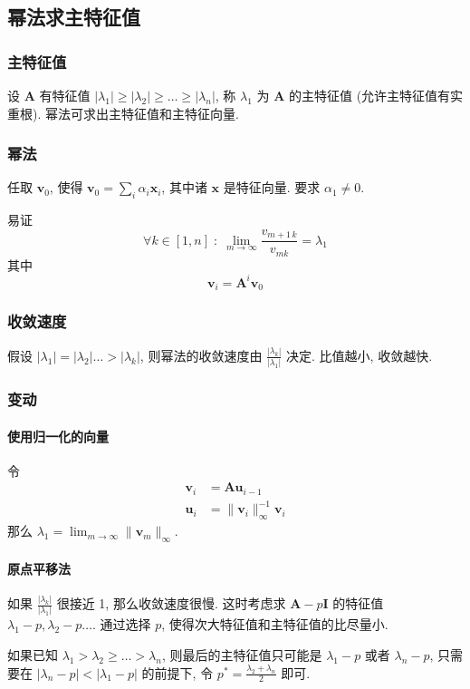 \documentclass{ctexart}
\begin{document}
\subsection{幂法求主特征值}
\subsubsection{主特征值}
    设 $\mathbf{A}$ 有特征值 $|\lambda_1| \ge |\lambda_2| \ge \ldots \ge |\lambda_n|$,
    称 $\lambda_1$ 为 $\mathbf{A}$ 的主特征值 (允许主特征值有实重根). 幂法可求出主特征值和主特征向量.
\subsubsection{幂法}
    任取 $\mathbf{v}_0$, 使得 $\mathbf{v}_0 = \sum_i \alpha_i \mathbf{x}_i$, 其中诸 $\mathbf{x}$ 是特征向量.
    要求 $\alpha_1 \neq 0$.\par
    易证 \[
        \forall k \in [1,n]\;:\; \lim_{m\to\infty} \frac{v_{m+1\,k}}{v_{mk}} = \lambda_1\]
    其中 \[ \mathbf{v}_i = \mathbf{A}^i \mathbf{v}_0 \]
\subsubsection{收敛速度}
    假设 $|\lambda_1| = |\lambda_2| \ldots > |\lambda_k|$, 则幂法的收敛速度由 $\frac{|\lambda_k|}{|\lambda_1|}$ 决定.
    比值越小, 收敛越快.
\subsubsection{变动}
\paragraph{使用归一化的向量}
    令\begin{align*}
        \mathbf{v}_i &= \mathbf{A} \mathbf{u}_{i-1}\\
        \mathbf{u}_i &= \|\mathbf{v}_i\|_{\infty}^{-1} \mathbf{v}_i
    \end{align*}
    那么 $\lambda_1 = \lim_{m\to\infty} \| \mathbf{v}_m \|_{\infty}$.
\paragraph{原点平移法}
    如果 $\frac{|\lambda_k|}{|\lambda_1|}$ 很接近 1, 那么收敛速度很慢.
    这时考虑求 $\mathbf{A} - p \mathbf{I} $ 的特征值 $\lambda_1 - p, \lambda_2 - p \ldots$.
    通过选择 $p$, 使得次大特征值和主特征值的比尽量小.\par
    如果已知 $\lambda_1 > \lambda_2 \ge \ldots > \lambda_n$,
    则最后的主特征值只可能是 $\lambda_1 -p$ 或者 $\lambda_n - p$, 只需要在
    $|\lambda_n - p| < |\lambda_1 - p|$ 的前提下, 令 $p^* = \frac{\lambda_2 + \lambda_n}{2}$ 即可.
\end{document}
